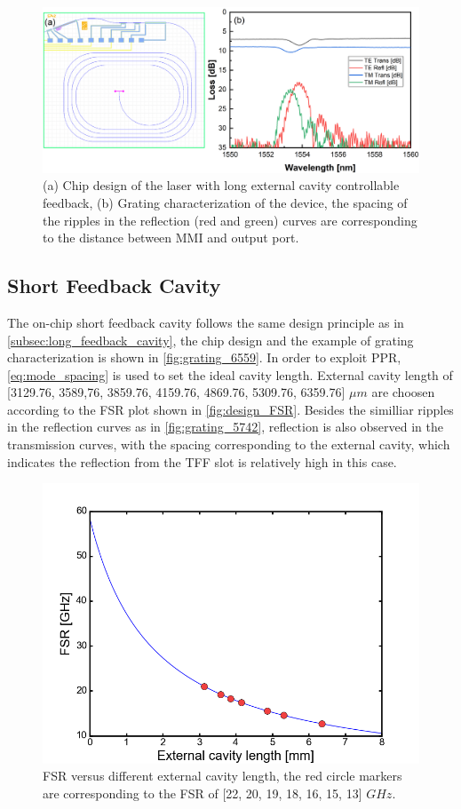 \begin{figure}[htb]
    \centering
    \includegraphics[width=\linewidth]{figures/grating_5742.png}
    \caption{(a) Chip design of the laser with long external cavity controllable feedback, (b) Grating characterization of the device, the spacing of the ripples in the reflection (red and green) curves are corresponding to the distance between MMI and output port.}
    \label{fig:grating_5742}
\end{figure}

\subsection{Short Feedback Cavity} \label{subsec:short_feedback_cavity}
The on-chip short feedback cavity follows the same design principle as in \autoref{subsec:long_feedback_cavity}, the chip design and the example of grating characterization is shown in \autoref{fig:grating_6559}. In order to exploit PPR, \autoref{eq:mode_spacing} is used to set the ideal cavity length. External cavity length of [3129.76, 3589,76, 3859.76, 4159.76, 4869.76, 5309.76, 6359.76] $\mu m$ are choosen according to the FSR plot shown in \autoref{fig:design_FSR}. Besides the similliar ripples in the reflection curves as in \autoref{fig:grating_5742}, reflection is also observed in the transmission curves, with the spacing corresponding to the external cavity, which indicates the reflection from the TFF slot is relatively high in this case.

\begin{figure}[ht]
    \centering
    \includegraphics[width=.6\linewidth]{figures/design_FSR.png}
    \caption{FSR versus different external cavity length, the red circle markers are corresponding to the FSR of [22, 20, 19, 18, 16, 15, 13] $GHz$.}
    \label{fig:design_FSR}
\end{figure}


